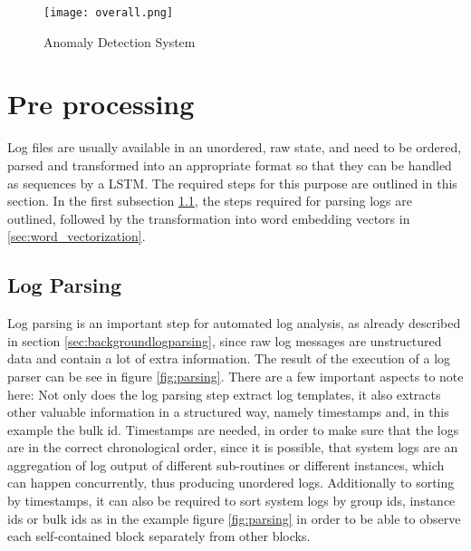 \begin{figure}[H]
	\centering
	\texttt{[image: overall.png]}
	\caption{Anomaly Detection System}
	\label{fig:overall_system}
\end{figure}

\section{Pre processing \label{sec:pre_processing}}
Log files are usually available in an unordered, raw state, and need to be ordered, parsed and transformed into an appropriate format so that they can be handled as sequences by a LSTM. The required steps for this purpose are outlined in this section. In the first subsection \ref{sec:conceptlogparsing}, the steps required for parsing logs are outlined, followed by the transformation into word embedding vectors in \ref{sec:word_vectorization}.

\subsection{Log Parsing}\label{sec:conceptlogparsing}
Log parsing is an important step for automated log analysis, as already described in section \ref{sec:backgroundlogparsing}, since raw log messages are unstructured data and contain a lot of extra information. The result of the execution of a log parser can be see in figure \ref{fig:parsing}. There are a few important aspects to note here: Not only does the log parsing step extract log templates, it also extracts other valuable information in a structured way, namely timestamps and, in this example the bulk id. Timestamps are needed, in order to make sure that the logs are in the correct chronological order, since it is possible, that system logs are an aggregation of log output of different sub-routines or different instances, which can happen concurrently, thus producing unordered logs. Additionally to sorting by timestamps, it can also be required to sort system logs by group ids, instance ids or bulk ids as in the example figure \ref{fig:parsing} in order to be able to observe each self-contained block separately from other blocks.

